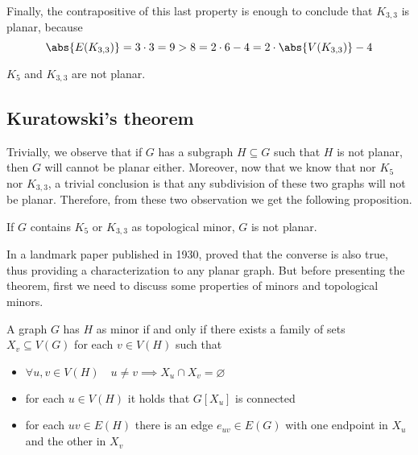 \documentclass[a4paper, 12pt]{report}
\begin{document}
    Finally, the contrapositive of this last property is enough to conclude that $K_{3,3}$ is  planar, because $$\abs{E(K_{3,3})} = 3 \cdot 3 = 9 > 8 = 2 \cdot 6 - 4 = 2 \cdot \abs{V(K_{3, 3})} - 4$$

    \begin{framedcor}{}
        $K_5$ and $K_{3,3}$ are not planar.
    \end{framedcor}

    \subsection{Kuratowski's theorem}

    Trivially, we observe that if $G$ has a subgraph $H \subseteq G$ such that $H$ is not planar, then $G$ will cannot be planar either. Moreover, now that we know that nor $K_5$ nor $K_{3,3}$, a trivial conclusion is that any subdivision of these two graphs will not be planar. Therefore, from these two observation we get the following proposition.

    \begin{framedlem}[label={kurat}]{}
        If $G$ contains $K_5$ or $K_{3,3}$ as topological minor, $G$ is not planar.
    \end{framedlem}

    In a landmark paper published in 1930, \textcite{kuratowski} proved that the converse is also true, thus providing a  characterization to any planar graph. But before presenting the theorem, first we need to discuss some properties of minors and topological minors.

    \begin{framedprop}[label={minor alt def}]{}
        A graph $G$ has $H$ as minor if and only if there exists a family of sets $X_v \subseteq V(G)$ for each $v \in V(H)$ such that

        \begin{itemize}
            \item $\forall u, v \in V(H) \quad u \neq v \implies X_u \cap X_v = \varnothing$
            \item for each $u \in V(H)$ it holds that $G[X_u]$ is connected
            \item for each $uv \in E(H)$ there is an edge $e_{uv} \in E(G)$ with one endpoint in $X_u$ and the other in $X_v$
        \end{itemize}
    \end{framedprop}
\end{document}
